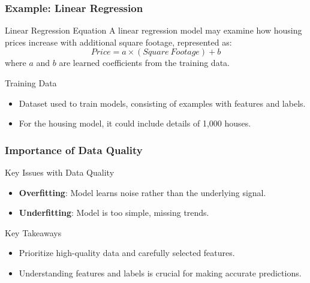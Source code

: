 \documentclass[aspectratio=169]{beamer}
\begin{document}
\begin{frame}[fragile]
    \frametitle{Example: Linear Regression}
    \begin{block}{Linear Regression Equation}
        A linear regression model may examine how housing prices increase with additional square footage, represented as:
        \begin{equation}
            Price = a \times (Square\ Footage) + b
        \end{equation}
        where \( a \) and \( b \) are learned coefficients from the training data.
    \end{block}

    \begin{block}{Training Data}
        \begin{itemize}
            \item Dataset used to train models, consisting of examples with features and labels.
            \item For the housing model, it could include details of 1,000 houses.
        \end{itemize}
    \end{block}
\end{frame}

\begin{frame}[fragile]
    \frametitle{Importance of Data Quality}
    \begin{block}{Key Issues with Data Quality}
        \begin{itemize}
            \item \textbf{Overfitting}: Model learns noise rather than the underlying signal.
            \item \textbf{Underfitting}: Model is too simple, missing trends.
        \end{itemize}
    \end{block}

    \begin{block}{Key Takeaways}
        \begin{itemize}
            \item Prioritize high-quality data and carefully selected features.
            \item Understanding features and labels is crucial for making accurate predictions.
        \end{itemize}
    \end{block}
\end{frame}
\end{document}
